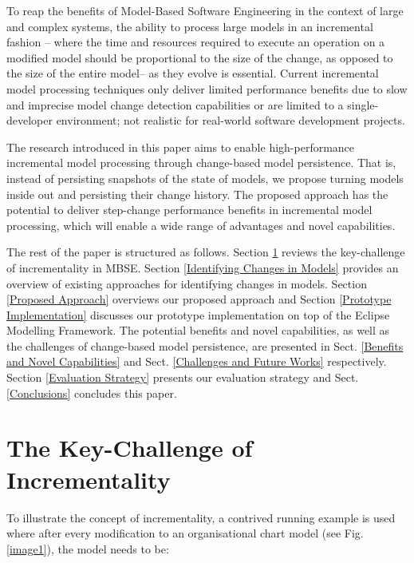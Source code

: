 \documentclass{llncs}
\begin{document}

To reap the benefits of Model-Based Software Engineering in the context of large and complex systems, the ability to process large models in an incremental fashion -- where the time and resources required to execute an operation on a modified model should be proportional to the size of the change, as opposed to the size of the entire model-- as they evolve is essential. Current incremental model processing techniques only deliver limited performance benefits due to slow and imprecise model change detection capabilities or are limited to a single-developer environment; not realistic for real-world software development projects. 

The research introduced in this paper aims to enable high-performance incremental model processing through change-based model persistence. That is, instead of persisting snapshots of the state of models, we propose turning models inside out and persisting their change history. The proposed approach has the potential to deliver step-change performance benefits in incremental model processing, which will enable a wide range of advantages and novel capabilities.

The rest of the paper is structured as follows. Section \ref{The Key-Challenge of Incrementality} reviews the key-challenge of incrementality in MBSE. Section \ref{Identifying Changes in Models} provides an overview of existing approaches for identifying changes in models. Section \ref{Proposed Approach} overviews our proposed approach and Section \ref{Prototype Implementation} discusses our prototype implementation on top of the Eclipse Modelling Framework. The potential benefits and novel capabilities, as well as the challenges of change-based model persistence, are presented in Sect. \ref{Benefits and Novel Capabilities} and Sect. \ref{Challenges and Future Works} respectively. Section \ref{Evaluation Strategy} presents our evaluation strategy and Sect. \ref{Conclusions} concludes this paper.

\section{The Key-Challenge of Incrementality}
\label{The Key-Challenge of Incrementality}
To illustrate the concept of incrementality, a contrived running example is used where after every modification to an organisational chart model (see Fig. \ref{image1}), the model needs to be:
\end{document}
